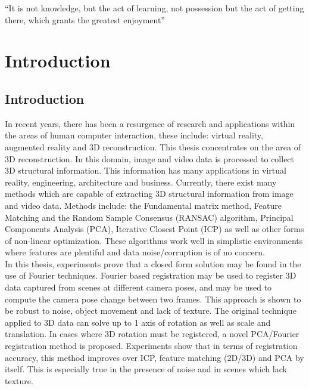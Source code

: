 \begin{savequote}[8cm]
  ``It is not knowledge, but the act of learning, not possession but the act of getting there, which grants the greatest enjoyment''
\end{savequote}
\makeatletter
\chapter{Introduction}



\section{Introduction}

In recent years, there has been a resurgence of research and applications within the areas of human computer interaction, these include: virtual reality, augmented reality and 3D reconstruction. This thesis concentrates on the area of 3D reconstruction. In this domain, image and video data is processed to collect 3D structural information. This information has many applications in virtual reality, engineering, architecture and business. Currently, there exist many methods which are capable of extracting 3D structural information from image and video data. Methods include: the Fundamental matrix method, Feature Matching and the Random Sample Consensus (RANSAC) algorithm, Principal Components Analysis (PCA), Iterative Closest Point (ICP) as well as other forms of non-linear optimization. These algorithms work well in simplistic environments where features are plentiful and data noise/corruption is of no concern. \\

In this thesis, experiments prove that a closed form solution may be found in the use of Fourier techniques. Fourier based registration may be used to register 3D data captured from scenes at different camera poses, and may be used to compute the camera pose change between two frames. This approach is shown to be robust to noise, object movement and lack of texture. The original technique applied to 3D data can solve up to 1 axis of rotation as well as scale and translation. In cases where 3D rotation must be registered, a novel PCA/Fourier registration method is proposed. Experiments show that in terms of registration accuracy, this method improves over ICP, feature matching (2D/3D) and PCA by itself. This is especially true in the presence of noise and in scenes which lack texture. \\

